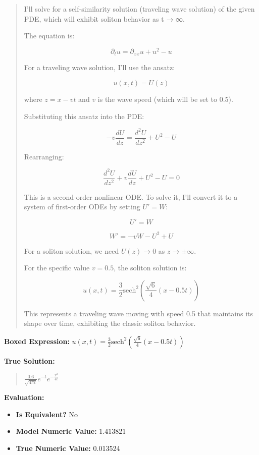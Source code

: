\documentclass{article}
\begin{document}
\begin{quote}
I'll solve for a self-similarity solution (traveling wave solution) of the given PDE, which will exhibit soliton behavior as t → ∞.



The equation is:

$$\partial_t u = \partial_{xx} u + u^2 - u$$



For a traveling wave solution, I'll use the ansatz:

$$u(x,t) = U(z)$$

where $z = x - vt$ and $v$ is the wave speed (which will be set to 0.5).



Substituting this ansatz into the PDE:

$$-v \frac{dU}{dz} = \frac{d^2U}{dz^2} + U^2 - U$$



Rearranging:

$$\frac{d^2U}{dz^2} + v \frac{dU}{dz} + U^2 - U = 0$$



This is a second-order nonlinear ODE. To solve it, I'll convert it to a system of first-order ODEs by setting $U' = W$:

$$U' = W$$

$$W' = -vW - U^2 + U$$



For a soliton solution, we need $U(z) \to 0$ as $z \to \pm\infty$.



For the specific value $v = 0.5$, the soliton solution is:



$$\boxed{u(x,t) = \frac{3}{2} \text{sech}^2\left(\frac{\sqrt{6}}{4}(x-0.5t)\right)}$$



This represents a traveling wave moving with speed 0.5 that maintains its shape over time, exhibiting the classic soliton behavior.
\end{quote}
\textbf{Boxed Expression:} $u(x,t) = \frac{3}{2} \text{sech}^2\left(\frac{\sqrt{6}}{4}(x-0.5t)\right)$

\textbf{True Solution:}
\begin{quote}
$\frac{0.6}{\sqrt{4 \pi t}} e^{-t} e^{-\frac{x^2}{4t}}$
\end{quote}

\textbf{Evaluation:}
\begin{itemize}
\item \textbf{Is Equivalent?} No
\item \textbf{Model Numeric Value:} 1.413821
\item \textbf{True Numeric Value:} 0.013524
\end{itemize}
\vspace{1cm}
\end{document}
